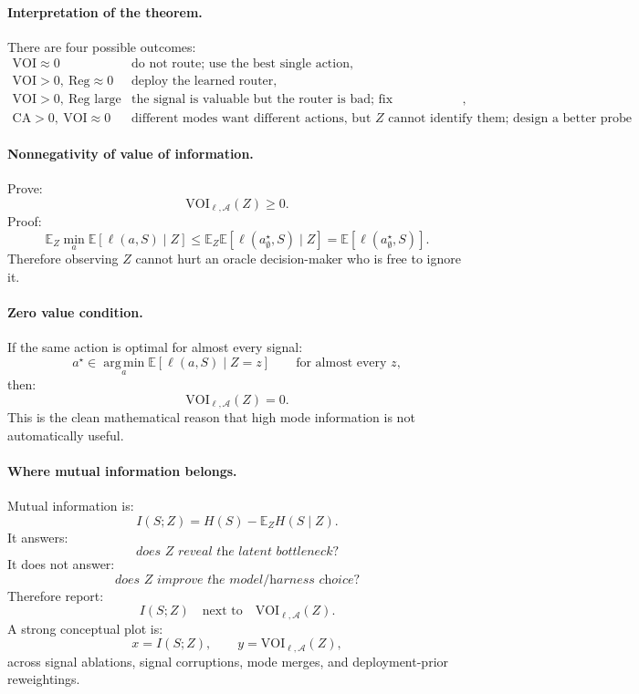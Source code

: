 \documentclass{article}
\providecommand{\argmin}{\operatorname*{arg\,min}}
\begin{document}
\paragraph{Interpretation of the theorem.}
There are four possible outcomes:
\[
\begin{array}{ll}
    \mathrm{VOI}\approx 0 &
    \text{do not route; use the best single action},\\
    \mathrm{VOI}>0,\ \mathrm{Reg}\approx 0 &
    \text{deploy the learned router},\\
    \mathrm{VOI}>0,\ \mathrm{Reg}\text{ large} &
    \text{the signal is valuable but the router is bad; fix calibration/decision rule},\\
    \mathrm{CA}>0,\ \mathrm{VOI}\approx 0 &
    \text{different modes want different actions, but \(Z\) cannot identify them;
    design a better probe}.
\end{array}
\]

\paragraph{Nonnegativity of value of information.}
Prove:
\[
    \mathrm{VOI}_{\ell,\mathcal A}(Z)\ge 0.
\]
Proof:
\[
    \mathbb E_Z \min_a \mathbb E[\ell(a,S)\mid Z]
    \le
    \mathbb E_Z \mathbb E[\ell(a^\star_{\emptyset},S)\mid Z]
    =
    \mathbb E[\ell(a^\star_{\emptyset},S)].
\]
Therefore observing \(Z\) cannot hurt an oracle decision-maker who is free to ignore it.

\paragraph{Zero value condition.}
If the same action is optimal for almost every signal:
\[
    a^\star
    \in
    \argmin_a \mathbb E[\ell(a,S)\mid Z=z]
    \qquad
    \text{for almost every }z,
\]
then:
\[
    \mathrm{VOI}_{\ell,\mathcal A}(Z)=0.
\]
This is the clean mathematical reason that high mode information is not automatically useful.

\paragraph{Where mutual information belongs.}
Mutual information is:
\[
    I(S;Z)
    =
    H(S)-\mathbb E_ZH(S\mid Z).
\]
It answers:
\[
    \textit{does \(Z\) reveal the latent bottleneck?}
\]
It does not answer:
\[
    \textit{does \(Z\) improve the model/harness choice?}
\]
Therefore report:
\[
    I(S;Z)
    \quad\text{next to}\quad
    \mathrm{VOI}_{\ell,\mathcal A}(Z).
\]
A strong conceptual plot is:
\[
    x=I(S;Z),
    \qquad
    y=\mathrm{VOI}_{\ell,\mathcal A}(Z),
\]
across signal ablations, signal corruptions, mode merges, and deployment-prior reweightings.
\end{document}
